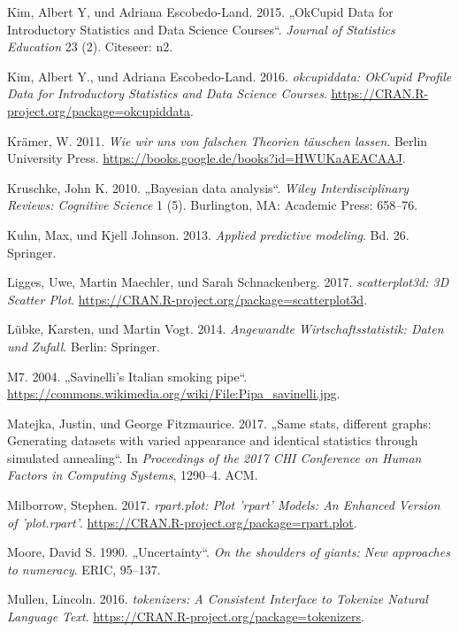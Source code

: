 \documentclass[12pt,ngerman,]{book}
\theoremstyle{definition}
\theoremstyle{definition}
\theoremstyle{remark}
\begin{document}
\hypertarget{ref-kim2015okcupid}{}
Kim, Albert Y, und Adriana Escobedo-Land. 2015. „OkCupid Data for
Introductory Statistics and Data Science Courses``. \emph{Journal of
Statistics Education} 23 (2). Citeseer: n2.

\hypertarget{ref-R-okcupiddata}{}
Kim, Albert Y., und Adriana Escobedo-Land. 2016. \emph{okcupiddata:
OkCupid Profile Data for Introductory Statistics and Data Science
Courses}. \url{https://CRAN.R-project.org/package=okcupiddata}.

\hypertarget{ref-kraemer2011wir}{}
Krämer, W. 2011. \emph{Wie wir uns von falschen Theorien täuschen
lassen}. Berlin University Press.
\url{https://books.google.de/books?id=HWUKaAEACAAJ}.

\hypertarget{ref-kruschke2010bayesian}{}
Kruschke, John K. 2010. „Bayesian data analysis``. \emph{Wiley
Interdisciplinary Reviews: Cognitive Science} 1 (5). Burlington, MA:
Academic Press: 658--76.

\hypertarget{ref-kuhn2013applied}{}
Kuhn, Max, und Kjell Johnson. 2013. \emph{Applied predictive modeling}.
Bd. 26. Springer.

\hypertarget{ref-R-scatterplot3d}{}
Ligges, Uwe, Martin Maechler, und Sarah Schnackenberg. 2017.
\emph{scatterplot3d: 3D Scatter Plot}.
\url{https://CRAN.R-project.org/package=scatterplot3d}.

\hypertarget{ref-lubke2014angewandte}{}
Lübke, Karsten, und Martin Vogt. 2014. \emph{Angewandte
Wirtschaftsstatistik: Daten und Zufall}. Berlin: Springer.

\hypertarget{ref-m7_savinellis_2004}{}
M7. 2004. „Savinelli's Italian smoking pipe``.
\url{https://commons.wikimedia.org/wiki/File:Pipa_savinelli.jpg}.

\hypertarget{ref-matejka2017same}{}
Matejka, Justin, und George Fitzmaurice. 2017. „Same stats, different
graphs: Generating datasets with varied appearance and identical
statistics through simulated annealing``. In \emph{Proceedings of the
2017 CHI Conference on Human Factors in Computing Systems}, 1290--4.
ACM.

\hypertarget{ref-R-rpart.plot}{}
Milborrow, Stephen. 2017. \emph{rpart.plot: Plot 'rpart' Models: An
Enhanced Version of 'plot.rpart'}.
\url{https://CRAN.R-project.org/package=rpart.plot}.

\hypertarget{ref-moore1990uncertainty}{}
Moore, David S. 1990. „Uncertainty``. \emph{On the shoulders of giants:
New approaches to numeracy}. ERIC, 95--137.

\hypertarget{ref-R-tokenizers}{}
Mullen, Lincoln. 2016. \emph{tokenizers: A Consistent Interface to
Tokenize Natural Language Text}.
\url{https://CRAN.R-project.org/package=tokenizers}.
\end{document}
